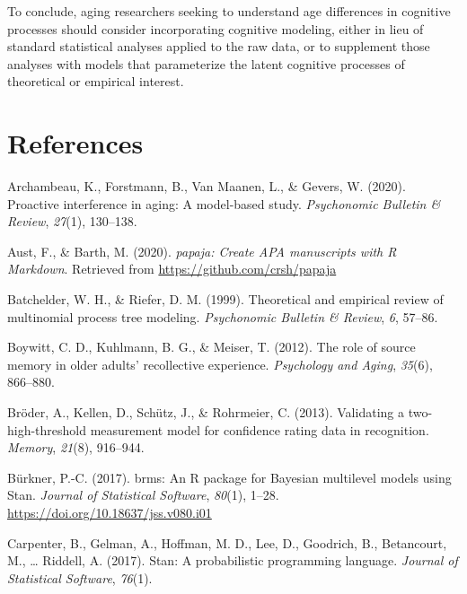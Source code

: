 \documentclass[
  english,
  ,man,floatsintext]{apa6}
\begin{document}
To conclude, aging researchers seeking to understand age differences in cognitive processes should consider incorporating cognitive modeling, either in lieu of standard statistical analyses applied to the raw data, or to supplement those analyses with models that parameterize the latent cognitive processes of theoretical or empirical interest.

\hypertarget{references}{%
\section{References}\label{references}}

\setlength{\parindent}{-0.5in}
\setlength{\leftskip}{0.5in}

\hypertarget{refs}{}
\leavevmode\hypertarget{ref-archambeau2020proactive}{}%
Archambeau, K., Forstmann, B., Van Maanen, L., \& Gevers, W. (2020). Proactive interference in aging: A model-based study. \emph{Psychonomic Bulletin \& Review}, \emph{27}(1), 130--138.

\leavevmode\hypertarget{ref-R-papaja}{}%
Aust, F., \& Barth, M. (2020). \emph{papaja: Create APA manuscripts with R Markdown}. Retrieved from \url{https://github.com/crsh/papaja}

\leavevmode\hypertarget{ref-BatchelderAndRiefer1999}{}%
Batchelder, W. H., \& Riefer, D. M. (1999). Theoretical and empirical review of multinomial process tree modeling. \emph{Psychonomic Bulletin \& Review}, \emph{6}, 57--86.

\leavevmode\hypertarget{ref-BoywittEtAl2012}{}%
Boywitt, C. D., Kuhlmann, B. G., \& Meiser, T. (2012). The role of source memory in older adults' recollective experience. \emph{Psychology and Aging}, \emph{35}(6), 866--880.

\leavevmode\hypertarget{ref-BroderEtAl2013}{}%
Bröder, A., Kellen, D., Schütz, J., \& Rohrmeier, C. (2013). Validating a two-high-threshold measurement model for confidence rating data in recognition. \emph{Memory}, \emph{21}(8), 916--944.

\leavevmode\hypertarget{ref-brms}{}%
Bürkner, P.-C. (2017). brms: An R package for Bayesian multilevel models using Stan. \emph{Journal of Statistical Software}, \emph{80}(1), 1--28. \url{https://doi.org/10.18637/jss.v080.i01}

\leavevmode\hypertarget{ref-carpenter2017stan}{}%
Carpenter, B., Gelman, A., Hoffman, M. D., Lee, D., Goodrich, B., Betancourt, M., \ldots{} Riddell, A. (2017). Stan: A probabilistic programming language. \emph{Journal of Statistical Software}, \emph{76}(1).
\end{document}
